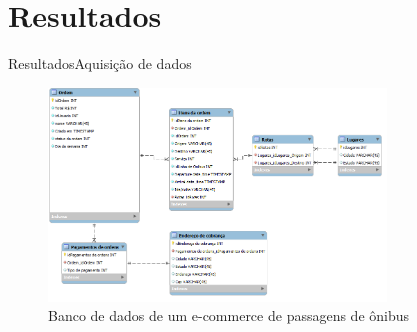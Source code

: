 \section[Resultados]{Resultados}

\begin{frame}{Resultados}{Aquisição de dados}
\begin{center}
\begin{figure}[ht]
    \includegraphics[width=0.8\textwidth]{../img/estrutura-banco-de-dados}
    \caption{Banco de dados de um e-commerce de passagens de ônibus}
    \label{fig:bd-clickbus}
\end{figure}
\end{center}
\end{frame}